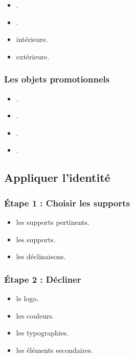 \begin{itemize}
    \item {}.
    \item {}.
    \item {} intérieure.
    \item {} extérieure.
\end{itemize}

\subsubsection{Les objets promotionnels}

\begin{itemize}
    \item {}.
    \item {}.
    \item {}.
    \item {}.
\end{itemize}

\subsection{Appliquer l'identité}

\subsubsection{Étape 1 : Choisir les supports}

\begin{itemize}
    \item {} les supports pertinents.
    \item {} les supports.
    \item {} les déclinaisons.
\end{itemize}

\subsubsection{Étape 2 : Décliner}

\begin{itemize}
    \item {} le logo.
    \item {} les couleurs.
    \item {} les typographies.
    \item {} les éléments secondaires.
\end{itemize}

